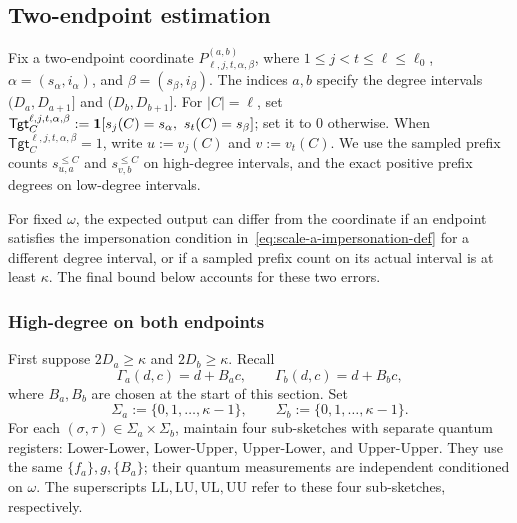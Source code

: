 \subsection{Two-endpoint estimation} \label{subsec:Two-endpoint_estimation}
Fix a two-endpoint coordinate $P^{(a,b)}_{\ell,j,t,\alpha,\beta}$, where $1\le j<t\le\ell\le\ell_0$, $\alpha=(s_\alpha,i_\alpha)$, and $\beta=(s_\beta,i_\beta)$.
The indices $a,b$ specify the degree intervals $(D_a,D_{a+1}]$ and $(D_b,D_{b+1}]$.
For $|C|=\ell$, set $\mathsf{Tgt}^{\ell,j,t,\alpha,\beta}_C:=\1[s_j(C)=s_\alpha,\ s_t(C)=s_\beta]$; set it to $0$ otherwise.
When $\mathsf{Tgt}^{\ell,j,t,\alpha,\beta}_C=1$, write $u:=v_j(C)$ and $v:=v_t(C)$.
We use the sampled prefix counts $s_{u,a}^{\le C}$ and $s_{v,b}^{\le C}$ on high-degree intervals, and the exact positive prefix degrees on low-degree intervals.

For fixed $\omega$, the expected output can differ from the coordinate if an endpoint satisfies the impersonation condition in~\eqref{eq:scale-a-impersonation-def} for a different degree interval, or if a sampled prefix count on its actual interval is at least $\kappa$.
The final bound below accounts for these two errors.

\subsubsection{High-degree on both endpoints} \label{sec:highhigh}
First suppose $2D_a\ge\kappa$ and $2D_b\ge\kappa$.
Recall
\[
  \Gamma_a(d,c)=d+B_a c,\qquad \Gamma_b(d,c)=d+B_b c,
\]
where $B_a,B_b$ are chosen at the start of this section.
Set
\[
  \Sigma_a:=\{0,1,\ldots,\kappa-1\},\qquad
  \Sigma_b:=\{0,1,\ldots,\kappa-1\}.
\]
For each $(\sigma,\tau)\in\Sigma_a\times\Sigma_b$, maintain four sub-sketches with separate quantum registers: Lower-Lower, Lower-Upper, Upper-Lower, and Upper-Upper.
They use the same $\{f_a\},g,\{B_a\}$; their quantum measurements are independent conditioned on $\omega$.
The superscripts $\mathrm{LL},\mathrm{LU},\mathrm{UL},\mathrm{UU}$ refer to these four sub-sketches, respectively.

